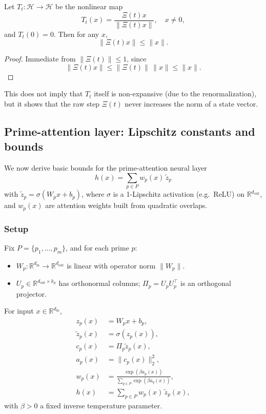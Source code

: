 \documentclass[11pt]{article}
\begin{document}
\begin{corollary}
Let $T_t:\mathcal{H}\to\mathcal{H}$ be the nonlinear map
\[
T_t(x) = \frac{\Xi(t) x}{\|\Xi(t)x\|},\quad x\neq 0,
\]
and $T_t(0)=0$. Then for any $x$,
\[
\|\Xi(t)x\| \le \|x\|.
\]
\end{corollary}

\begin{proof}
Immediate from $\|\Xi(t)\|\le 1$, since
\[
\|\Xi(t)x\| \le \|\Xi(t)\|\,\|x\| \le \|x\|.
\]
\end{proof}

This does not imply that $T_t$ itself is non-expansive (due to the renormalization), but it shows that the raw step $\Xi(t)$ never increases the norm of a state vector.

\subsection{Prime-attention layer: Lipschitz constants and bounds}

We now derive basic bounds for the prime-attention neural layer
\[
h(x) = \sum_{p\in P} w_p(x)\,\tilde{z}_p
\]
with $\tilde{z}_p = \sigma(W_p x + b_p)$, where $\sigma$ is a 1-Lipschitz activation (e.g.\ ReLU) on $\mathbb{R}^{d_{\mathrm{out}}}$, and $w_p(x)$ are attention weights built from quadratic overlaps.

\subsubsection{Setup}

Fix $P=\{p_1,\dots,p_m\}$, and for each prime $p$:
\begin{itemize}[nosep]
  \item $W_p:\mathbb{R}^{d_{\mathrm{in}}}\to \mathbb{R}^{d_{\mathrm{out}}}$ is linear with operator norm $\|W_p\|$.
  \item $U_p\in\mathbb{R}^{d_{\mathrm{out}}\times k_p}$ has orthonormal columns; $\Pi_p = U_p U_p^\top$ is an orthogonal projector.
\end{itemize}

For input $x\in\mathbb{R}^{d_{\mathrm{in}}}$,
\begin{align*}
z_p(x) &= W_p x + b_p,\\
\tilde{z}_p(x) &= \sigma(z_p(x)),\\
c_p(x) &= \Pi_p \tilde{z}_p(x),\\
a_p(x) &= \|c_p(x)\|_2^2,\\
w_p(x) &= \frac{\exp(\beta a_p(x))}{\sum_{q\in P} \exp(\beta a_q(x))},\\
h(x) &= \sum_{p\in P} w_p(x)\,\tilde{z}_p(x),
\end{align*}
with $\beta>0$ a fixed inverse temperature parameter.
\end{document}
